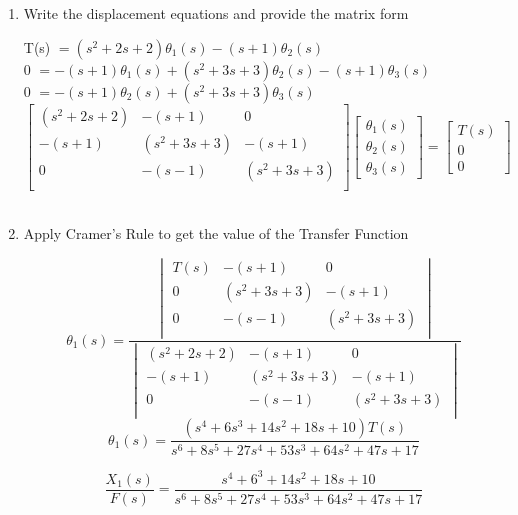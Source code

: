 \begin{fold}
\begin{enumerate}[label=(\alph*),itemindent=*, itemindent=*, leftmargin=*, nolistsep]
\begin{center}
        \end{center}
\vspace{15pt}
		\item Write the displacement equations and provide the matrix form
\begin{center}
	T(s) $= (s^2 + 2s + 2)\theta_1(s) - (s + 1)\theta_2(s)$\\
	0 $= -(s + 1)\theta_1(s) + (s^2 + 3s + 3)\theta_2(s) -(s+1)\theta_3(s)$\\
	0 $= -(s + 1)\theta_2(s) + (s^2 + 3s + 3)\theta_3(s)$\\
	\[
		\begin{bmatrix}
		(s^2 + 2s + 2) & -(s + 1) & 0\\
		-(s + 1) & (s^2 + 3s + 3) & -(s+1)\\
		0 & -(s-1) & (s^2 + 3s +3)\\
		\end{bmatrix}
		\begin{bmatrix}
		\theta_1(s) \\
		\theta_2(s) \\
		\theta_3(s)
		\end{bmatrix}
		=
		\begin{bmatrix}
		T(s)\\
		0\\
		0
		\end{bmatrix}
	\]\\
\end{center}
\vspace{15pt}
		\item Apply Cramer's Rule to get the value of the Transfer Function
\begin{center}
	\[
		\theta_1(s) = 
			\frac{\begin{vmatrix}
				T(s) & -(s + 1) & 0\\
				0 & (s^2 + 3s + 3) & -(s+1)\\
				0 & -(s-1) & (s^2 + 3s + 3)\\
			\end{vmatrix}
		}{\begin{vmatrix}
				(s^2 + 2s + 2) & -(s + 1) & 0\\
				-(s + 1) & (s^2 + 3s + 3) & -(s+1)\\
				0 & -(s-1) & (s^2 + 3s + 3)\\
			\end{vmatrix}
		}
	\]
	\[
	\theta_1(s) = \frac{(s^4 + 6s^3 + 14s^2 + 18s + 10)T(s)}{s^6 + 8s^5 + 27s^4 + 53s^3 + 64s^2 + 47s + 17}
	\] 

	\[
	\boxed{\frac{X_1(s)}{F(s)} = \frac{s^4 + 6^3 + 14s^2 + 18s + 10}{s^6 + 8s^5 + 27s^4 + 53s^3 + 64s^2 + 47s + 17}}
	\] 

\end{center}
	\end{enumerate}


\end{fold}

